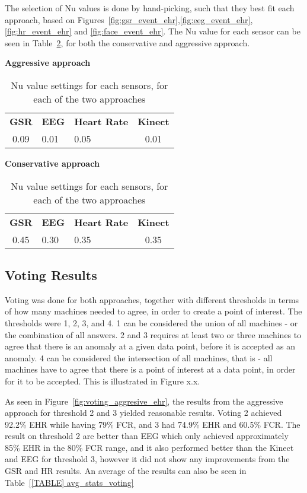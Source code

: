 The selection of Nu values is done by hand-picking, such that they best fit each approach, based on Figures~\ref{fig:gsr_event_ehr},\ref{fig:eeg_event_ehr},\ref{fig:hr_event_ehr} and \ref{fig:face_event_ehr}.
The Nu value for each sensor can be seen in Table~\ref{tab:nu_voting_settings}, for both the conservative and aggressive approach.

\begin{table}[h]
  \centering
  \textbf{Aggressive approach}\vspace{2pt}
  \begin{tabularx}{\columnwidth}{cXXc}
    \toprule
    \textbf{GSR} & \textbf{EEG} & \textbf{Heart Rate} & \textbf{Kinect} \\
    0.09 & 0.01 & 0.05 & 0.01 \\
    \bottomrule
  \end{tabularx}

  \textbf{Conservative approach}\vspace{2pt}
  \begin{tabularx}{\columnwidth}{cXXc}
    \toprule
    \textbf{GSR} & \textbf{EEG} & \textbf{Heart Rate} & \textbf{Kinect} \\
    0.45 & 0.30 & 0.35 & 0.35 \\
    \bottomrule
  \end{tabularx}
  \caption{Nu value settings for each sensors, for each of the two approaches}
  \label{tab:nu_voting_settings}
\end{table}


\subsection{Voting Results}
Voting was done for both approaches, together with different thresholds in terms of how many machines needed to agree, in order to create a point of interest.
The thresholds were 1, 2, 3, and 4. 
1 can be considered the union of all machines - or the combination of all answers.
2 and 3 requires at least two or three machines to agree that there is an anomaly at a given data point, before it is accepted as an anomaly.
4 can be considered the intersection of all machines, that is - all machines have to agree that there is a point of interest at a data point, in order for it to be accepted.
This is illustrated in Figure x.x.




As seen in Figure~\ref{fig:voting_aggresive_ehr}, the results from the aggressive approach for threshold 2 and 3 yielded reasonable results.
Voting 2 achieved 92.2\% EHR while having 79\% FCR, and 3 had 74.9\% EHR and 60.5\% FCR.
The result on threshold 2 are better than EEG which only achieved approximately 85\% EHR in the 80\% FCR range, and it
also performed better than the Kinect and EEG for threshold 3, however it did not show any improvements from the GSR and
HR results.
An average of the results can also be seen in Table~\ref{[TABLE] avg_stats_voting}

